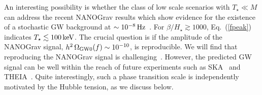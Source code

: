 \documentclass[a4paper,11pt]{article}
\begin{document}
An interesting possibility is whether the class of low scale scenarios with $T_\star \ll M$
can address the recent NANOGrav results which show evidence for the existence of a stochastic 
GW background at $\sim 10^{-8}\, {\rm Hz}$~\cite{Arzoumanian:2020vkk}. For $\beta/H_\star \gtrsim 1000$, 
Eq.~(\ref{fpeak}) indicates $T_{\star} \lesssim 100\, {\rm keV}$. The crucial question is if the amplitude
of the NANOGrav signal, $h^2\,\Omega_{\rm GW0}(f)\sim 10^{-10}$, is reproducible.
We will find that reproducing the NANOGrav signal is challenging~\cite{Arzoumanian:2021teu}. 
However, the predicted GW signal can be well within the reach of future experiments such as SKA~\cite{Janssen:2014dka} and THEIA~\cite{THEIA}. Quite interestingly, such a phase transition scale is independently motivated by  the Hubble tension, 
as we discuss below.
\end{document}

